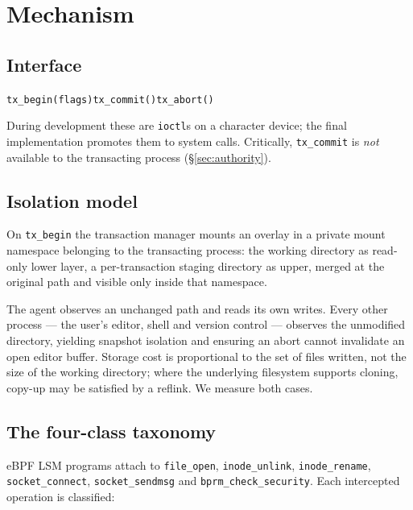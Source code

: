 \documentclass[10pt,twocolumn]{article}
\begin{document}
\section{Mechanism}
\label{sec:design}

\subsection{Interface}

\begin{center}
\texttt{tx\_begin(flags)}\quad\texttt{tx\_commit()}\quad\texttt{tx\_abort()}
\end{center}

\noindent During development these are \texttt{ioctl}s on a character device;
the final implementation promotes them to system calls. Critically,
\texttt{tx\_commit} is \emph{not} available to the transacting process
(\S\ref{sec:authority}).

\subsection{Isolation model}

On \texttt{tx\_begin} the transaction manager mounts an overlay in a private
mount namespace belonging to the transacting process: the working directory as
read-only lower layer, a per-transaction staging directory as upper, merged at
the original path and visible only inside that namespace.

The agent observes an unchanged path and reads its own writes. Every other
process --- the user's editor, shell and version control --- observes the
unmodified directory, yielding snapshot isolation and ensuring an abort cannot
invalidate an open editor buffer. Storage cost is proportional to the set of
files written, not the size of the working directory; where the underlying
filesystem supports cloning, copy-up may be satisfied by a reflink. We measure
both cases.

\subsection{The four-class taxonomy}

eBPF LSM programs attach to \texttt{file\_open}, \texttt{inode\_unlink},
\texttt{inode\_rename}, \texttt{socket\_connect}, \texttt{socket\_sendmsg} and
\texttt{bprm\_check\_security}. Each intercepted operation is classified:
\end{document}
